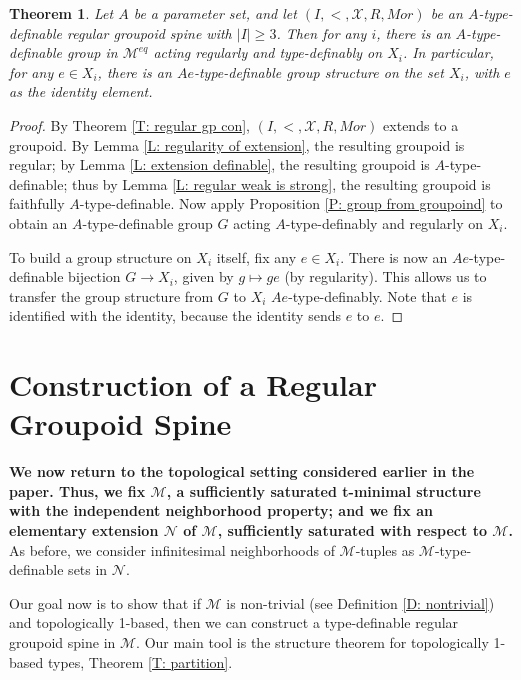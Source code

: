 \documentclass{amsart}
\newtheorem{theorem}{Theorem}[section]
\theoremstyle{definition}
\begin{document}
\begin{theorem}\label{T: combinatorial group conf}
    Let $A$ be a parameter set, and let $(I,<,\mathcal X,R,Mor)$ be an $A$-type-definable regular groupoid spine with $|I|\geq 3$. Then for any $i$, there is an $A$-type-definable group in $\mathcal M^{eq}$ acting regularly and type-definably on $X_i$. In particular, for any $e\in X_i$, there is an $Ae$-type-definable group structure on the set $X_i$, with $e$ as the identity element.
\end{theorem}
\begin{proof}
    By Theorem \ref{T: regular gp con}, $(I,<,\mathcal X,R,Mor)$ extends to a groupoid. By Lemma \ref{L: regularity of extension}, the resulting groupoid is regular; by Lemma \ref{L: extension definable}, the resulting groupoid is $A$-type-definable; thus by Lemma \ref{L: regular weak is strong}, the resulting groupoid is faithfully $A$-type-definable. Now apply Proposition \ref{P: group from groupoind} to obtain an $A$-type-definable group $G$ acting $A$-type-definably and regularly on $X_i$.

    To build a group structure on $X_i$ itself, fix any $e\in X_i$. There is now an $Ae$-type-definable bijection $G\rightarrow X_i$, given by $g\mapsto ge$ (by regularity). This allows us to transfer the group structure from $G$ to $X_i$ $Ae$-type-definably. Note that $e$ is identified with the identity, because the identity sends $e$ to $e$.
    \end{proof}

\section{Construction of a Regular Groupoid Spine}

\textbf{We now return to the topological setting considered earlier in the paper. Thus, we fix $\mathcal M$, a sufficiently saturated t-minimal structure with the independent neighborhood property; and we fix an elementary extension $\mathcal N$ of $\mathcal M$, sufficiently saturated with respect to $\mathcal M$.} As before, we consider infinitesimal neighborhoods of $\mathcal M$-tuples as $\mathcal M$-type-definable sets in $\mathcal N$.

Our goal now is to show that if $\mathcal M$ is non-trivial (see Definition \ref{D: nontrivial}) and topologically 1-based, then we can construct a type-definable regular groupoid spine in $\mathcal M$. Our main tool is the structure theorem for topologically 1-based types, Theorem \ref{T: partition}.
\end{document}
